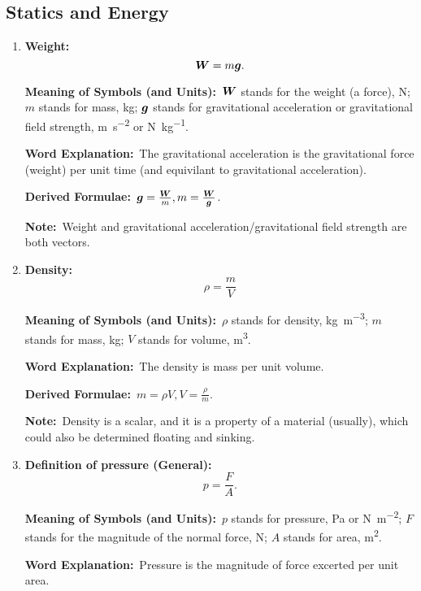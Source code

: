 \documentclass[8pt]{article}
\newcommand{\MeanSymb}{\textbf{Meaning of Symbols (and Units):}\ }
\newcommand{\WordExpl}{\textbf{Word Explanation:}\ }
\newcommand{\DeriForm}{\textbf{Derived Formulae:}\ }
\newcommand{\Note}{\textbf{Note:}\ }
\begin{document}
        \subsection{Statics and Energy}
            \begin{enumerate}
                \item \textbf{Weight:}
                \[
                    \boldsymbol{W} = m \boldsymbol{g}.
                \]

                \MeanSymb \(\boldsymbol{W}\) stands for the weight (a force), \unit{\newton}; \(m\) stands for mass, \unit{\kilogram}; \(\boldsymbol{g}\) stands for gravitational acceleration or gravitational field strength, \unit{\metre\per\second\squared} or \unit{\newton\per\kilogram}.

                \WordExpl The gravitational acceleration is the gravitational force (weight) per unit time (and equivilant to gravitational acceleration).

                \DeriForm \(\boldsymbol{g} = \frac{\boldsymbol{W}}{m}, m = \frac{\boldsymbol{W}}{\boldsymbol{g}}\).

                \Note Weight and gravitational acceleration/gravitational field strength are both vectors.

                \item \textbf{Density:}
                \[
                    \rho = \frac{m}{V}
                \]

                \MeanSymb \(\rho\) stands for density, \unit{\kilogram \per \metre\cubed}; \(m\) stands for mass, \unit{\kilogram}; \(V\) stands for volume, \unit{\metre\cubed}.

                \WordExpl The density is mass per unit volume.

                \DeriForm \(m = \rho V, V = \frac{\rho}{m}\).

                \Note Density is a scalar, and it is a property of a material (usually), which could also be determined floating and sinking.
                
                \item \textbf{Definition of pressure (General):}
                \[
                    p = \frac{F}{A}.
                \]

                \MeanSymb \(p\) stands for pressure, \unit{\pascal} or \unit{\newton\per\metre\squared}; \(F\) stands for the magnitude of the normal force, \unit{\newton}; \(A\) stands for area, \unit{\metre\squared}.

                \WordExpl Pressure is the magnitude of force excerted per unit area.


\end{enumerate}
\end{document}

